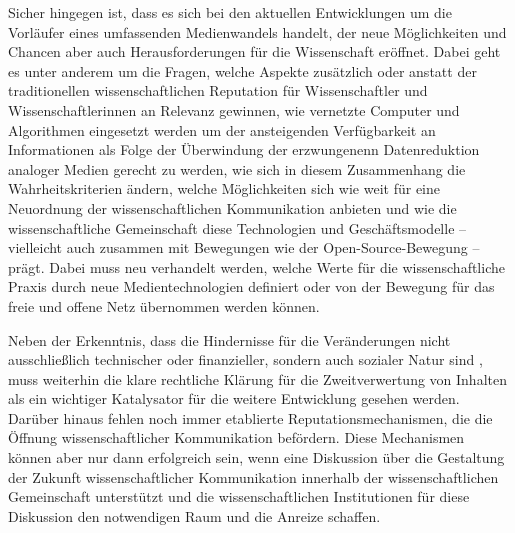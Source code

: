 Sicher hingegen ist, dass es sich bei den aktuellen Entwicklungen um die Vorläufer eines umfassenden Medienwandels handelt, der neue Möglichkeiten und Chancen aber auch Herausforderungen für die Wissenschaft eröffnet. Dabei geht es unter anderem um die Fragen, welche Aspekte zusätzlich oder anstatt der traditionellen wissenschaftlichen Reputation für Wissenschaftler und Wissenschaftlerinnen an Relevanz gewinnen, wie vernetzte Computer und Algorithmen eingesetzt werden um der ansteigenden Verfügbarkeit an Informationen als Folge der Überwindung der erzwungenenn Datenreduktion analoger Medien gerecht zu werden, wie sich in diesem Zusammenhang die Wahrheitskriterien ändern, welche Möglichkeiten sich wie weit für eine Neuordnung der wissenschaftlichen Kommunikation anbieten und wie die wissenschaftliche Gemeinschaft diese Technologien und Geschäftsmodelle – vielleicht auch zusammen mit Bewegungen wie der Open-Source-Bewegung – prägt. Dabei muss neu verhandelt werden, welche Werte für die wissenschaftliche Praxis durch neue Medientechnologien definiert oder von der Bewegung für das freie und offene Netz übernommen werden können.

Neben der Erkenntnis, dass die Hindernisse für die Veränderungen nicht ausschließlich technischer oder finanzieller, sondern auch sozialer Natur sind \cite{nosek_2012_scientific}, muss weiterhin die klare rechtliche Klärung für die Zweitverwertung von Inhalten als ein wichtiger Katalysator für die weitere Entwicklung gesehen werden. Darüber hinaus fehlen noch immer etablierte Reputationsmechanismen, die die Öffnung wissenschaftlicher Kommunikation befördern. Diese Mechanismen können aber nur dann erfolgreich sein, wenn eine Diskussion über die Gestaltung der Zukunft wissenschaftlicher Kommunikation innerhalb der wissenschaftlichen Gemeinschaft unterstützt und die wissenschaftlichen Institutionen für diese Diskussion den notwendigen Raum und die Anreize schaffen.

